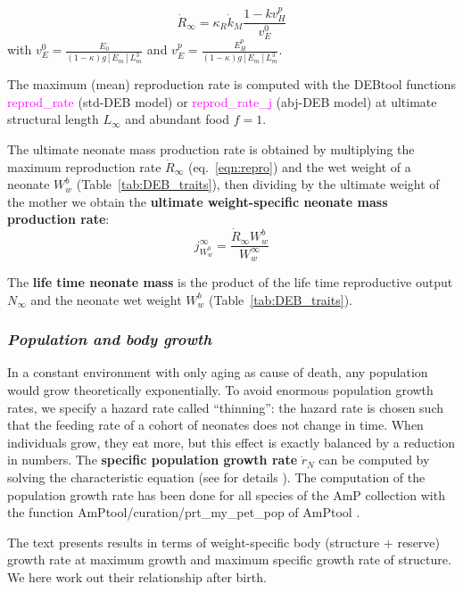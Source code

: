 \documentclass{article}
\begin{document}
\begin{equation} \label{eqn:repro}
\dot{R}_\infty = \kappa_R \dot{k}_M \frac{1-k v_H^p}{v_E^0}
\end{equation}
with $v_E^0=\frac{E_0}{(1-\kappa)g[E_m]L_m^3}$ and $v_E^p=\frac{E_H^p}{(1-\kappa)g[E_m]L_m^3}$.

The maximum (mean) reproduction rate is computed with the DEBtool functions \textcolor{magenta}{reprod\_rate} (std-DEB model) or \textcolor{magenta}{reprod\_rate\_j} (abj-DEB model) at ultimate structural length $L_\infty$ and abundant food $f=1$.

The ultimate neonate mass production rate is obtained by multiplying the maximum reproduction rate $\dot{R}_\infty$ (eq.~\ref{eqn:repro}) and the wet weight of a neonate $W_w^b$ (Table~\ref{tab:DEB_traits}), then dividing by the ultimate weight of the mother we obtain the {\bf ultimate weight-specific neonate mass production rate}: 
\begin{equation}
j_{W_w^b}^\infty = \frac{\dot{R}_\infty W_w^b}{W_w^\infty}
\end{equation}

The {\bf life time neonate mass} is the product of the life time reproductive output $N_\infty$  and the neonate wet weight $W_w^b$ (Table~\ref{tab:DEB_traits}). 

\subsubsection*{\it Population and body growth}

In a constant environment with only aging as cause of death, any  population would grow theoretically exponentially. To avoid enormous population growth rates, we specify a hazard rate called “thinning”: the hazard rate is chosen such that the feeding rate of a cohort of neonates does not change in time. When individuals grow, they eat more, but this effect is exactly balanced by a reduction in numbers. 
The {\bf specific population growth rate} $\dot{r}_N$ can be computed by solving the characteristic equation (see for details \cite{KooyLika2020}).
The computation of the population growth rate has been done for all species of the AmP collection with the function AmPtool/curation/prt\_my\_pet\_pop of AmPtool \citep{AmPtool2022}.

The text presents results in terms of weight-specific body (structure + reserve) growth rate at
maximum growth and maximum specific growth rate of structure. We here work out their relationship after birth.
\end{document}
